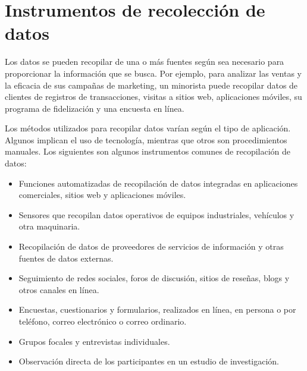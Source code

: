 \documentclass[10pt,journal]{IEEEtran}
\begin{document}
\section{\textbf{Instrumentos de recolección de datos}}
Los datos se pueden recopilar de una o más fuentes según sea necesario para proporcionar la información que se busca. Por ejemplo, para analizar las ventas y la eficacia de sus campañas de marketing, un minorista puede recopilar datos de clientes de registros de transacciones, visitas a sitios web, aplicaciones móviles, su programa de fidelización y una encuesta en línea.\citep{on}\par
Los métodos utilizados para recopilar datos varían según el tipo de aplicación. Algunos implican el uso de tecnología, mientras que otros son procedimientos manuales. Los siguientes son algunos instrumentos comunes de recopilación de datos:
\begin{itemize}
    \item Funciones automatizadas de recopilación de datos integradas en aplicaciones comerciales, sitios web y aplicaciones móviles.
    \item Sensores que recopilan datos operativos de equipos industriales, vehículos y otra maquinaria.
    \item Recopilación de datos de proveedores de servicios de información y otras fuentes de datos externas.
    \item Seguimiento de redes sociales, foros de discusión, sitios de reseñas, blogs y otros canales en línea.
    \item Encuestas, cuestionarios y formularios, realizados en línea, en persona o por teléfono, correo electrónico o correo ordinario.
    \item Grupos focales y entrevistas individuales.
    \item Observación directa de los participantes en un estudio de investigación.
\end{itemize}
\end{document}
